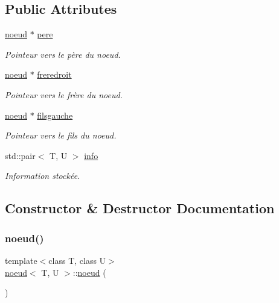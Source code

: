 \subsection*{Public Attributes}
\begin{DoxyCompactItemize}
\item 
\hyperlink{classnoeud}{noeud} $\ast$ \hyperlink{classnoeud_ab00690971a24c6013c5484aeb23eecbf}{pere}
\begin{DoxyCompactList}\small\item\em Pointeur vers le père du noeud. \end{DoxyCompactList}\item 
\hyperlink{classnoeud}{noeud} $\ast$ \hyperlink{classnoeud_aaeab078493a53d62f1ae0a99e53a9308}{freredroit}
\begin{DoxyCompactList}\small\item\em Pointeur vers le frère du noeud. \end{DoxyCompactList}\item 
\hyperlink{classnoeud}{noeud} $\ast$ \hyperlink{classnoeud_ae467dc4fa40f58924f45ac7ca634cd03}{filsgauche}
\begin{DoxyCompactList}\small\item\em Pointeur vers le fils du noeud. \end{DoxyCompactList}\item 
std\+::pair$<$ T, U $>$ \hyperlink{classnoeud_ad6e70a2d7350a11040d53468eaa40510}{info}
\begin{DoxyCompactList}\small\item\em Information stockée. \end{DoxyCompactList}\end{DoxyCompactItemize}


\subsection{Constructor \& Destructor Documentation}
\mbox{\label{classnoeud_ad68daacd6bece9b3358ffce75ba4fcb3}} 
\subsubsection{\texorpdfstring{noeud()}{noeud()}\hspace{0.1cm}{\footnotesize\ttfamily [1/3]}}
{\footnotesize\ttfamily template$<$class T, class U$>$ \\
\hyperlink{classnoeud}{noeud}$<$ T, U $>$\+::\hyperlink{classnoeud}{noeud} (\begin{DoxyParamCaption}{ }\end{DoxyParamCaption})\hspace{0.3cm}{\ttfamily [inline]}}



